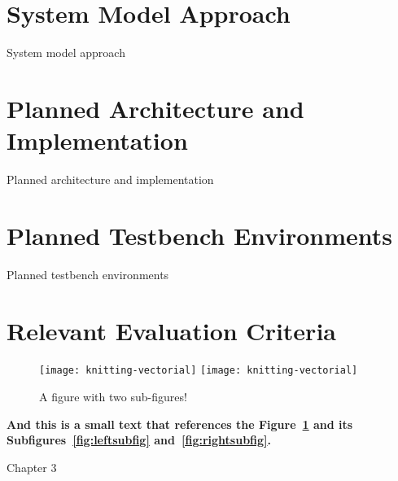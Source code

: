 \section{System Model Approach} %
\label{sec:system_model_approach}

System model approach

\section{Planned Architecture and Implementation} %
\label{sec:planned_architecture_and_implementation}

Planned architecture and implementation

\section{Planned Testbench Environments} %
\label{sec:planned_testbench_environments}

Planned testbench environments

\section{Relevant Evaluation Criteria} %
\label{sec:relevant_evaluation_criteria}

\begin{figure}[htbp]
  \centering
    {\texttt{[image: knitting-vectorial]}}%
    {\texttt{[image: knitting-vectorial]}}%
  \caption{A figure with two sub-figures!}
  \label{fig:fig2subfig}
\end{figure}

\textbf{And this is a small text that references the Figure~\ref{fig:fig2subfig} and its Subfigures~\ref{fig:leftsubfig} and~\ref{fig:rightsubfig}.}

Chapter 3